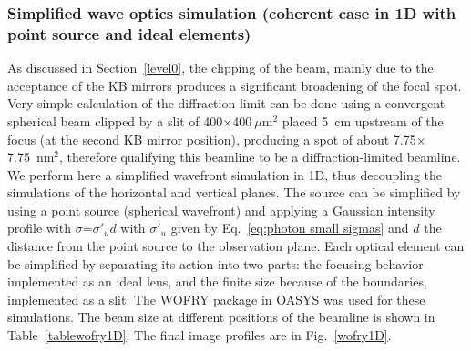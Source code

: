 \documentclass{iucr}              %
\begin{document}
\subsubsection{Simplified wave optics simulation (coherent case in 1D with point source and ideal elements)}
\label{wofry}

As discussed in Section~\ref{level0}, the clipping of the beam, mainly due to the acceptance of the KB mirrors produces a significant broadening of the focal spot.  Very simple calculation of the diffraction limit can be done using a convergent spherical beam clipped by a slit of 400$\times$400$~\mu$m$^2$ placed 5~cm upstream of the focus (at the second KB mirror position), producing a spot of about 7.75$\times$7.75~nm$^2$, therefore qualifying this beamline to be a diffraction-limited beamline. We perform here a simplified wavefront simulation in 1D, thus decoupling the simulations of the horizontal and vertical planes. The source can be simplified by using a point source (spherical wavefront) and applying a Gaussian intensity profile with $\sigma$=$\sigma'_u d$ with $\sigma'_u$ given by Eq.~\ref{eq:photon small sigmas} and $d$ the distance from the point source to the observation plane. Each optical element can be simplified by separating its action into two parts: the focusing behavior implemented as an ideal lens, and the finite size because of the boundaries, implemented as a slit. The WOFRY package \cite{codeWOFRY} in OASYS was used for these simulations. The beam size at different positions of the beamline is shown in Table~\ref{tablewofry1D}. The final image profiles are in Fig.~\ref{wofry1D}.

\begin{table}[]
    \centering
    \caption{Beam sizes calculated with simplified wave optics propagation (point source and ideal lenses with aperture for modeling the element dimensions). The zoom or scaling factor used for the propagation is also displayed. 
    }
    \label{tablewofry1D}
\end{table}
\end{document}
